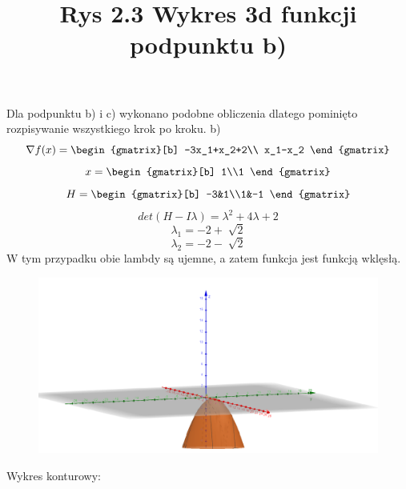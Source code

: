 \documentclass{article}
\begin{document}
Dla podpunktu b) i c) wykonano podobne obliczenia dlatego pominięto rozpisywanie wszystkiego krok po kroku.
b)
\begin{equation}
  \nabla f(x)=
  \begin{gmatrix}[b]
    -3x_1+x_2+2\\ x_1-x_2
  \end{gmatrix}
\end{equation}
\begin{equation}
  x=\begin{gmatrix}[b]
    1\\1
  \end{gmatrix}
\end{equation}
\begin{equation}
  H=\begin{gmatrix}[b]
    -3&1\\1&-1
  \end{gmatrix}
\end{equation}
\begin{equation}
  det(H-I\lambda)=\lambda^2+4\lambda+2
\end{equation}
\begin{equation}
  \lambda_1=-2+\sqrt[]{2}
\end{equation}
\begin{equation}
  \lambda_2=-2-\sqrt[]{2}
\end{equation}
W tym przypadku obie lambdy są ujemne, a zatem funkcja jest funkcją wklęsłą.
\begin{figure}[h]
  \includegraphics[scale=0.4]{Zadanie2b-wykres.png}
  \title{Rys 2.3 Wykres 3d funkcji podpunktu b)}
  \centering
\end{figure}
\newpage
Wykres konturowy:
\end{document}
